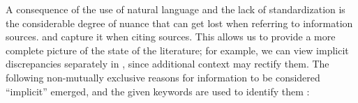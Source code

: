 A consequence of the use of natural language and the lack of standardization
is the considerable degree of nuance that can get lost when referring to
information sources. \rigidBlurb{} and capture it when citing sources. This
allows us to provide a more complete picture of the state of the literature;
for example, we can view implicit discrepancies separately in
, since additional context may rectify
them. The following non-mutually exclusive reasons for information to be
considered ``implicit'' emerged, and the given keywords are used to identify
them :

